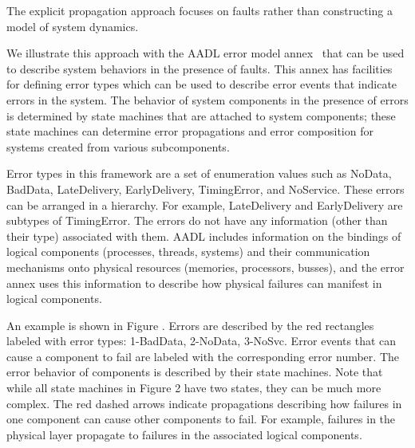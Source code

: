 The explicit propagation approach focuses on faults rather than constructing a model of system dynamics.  

We illustrate this approach with the AADL error model annex~\cite{SAEAS} that can be used to describe system behaviors in the presence of faults. This annex has facilities for defining error types which can be used to describe error events that indicate errors in the system. The behavior of system components in the presence of errors is determined by state machines that are attached to system components; these state machines can determine error propagations and error composition for systems created from various subcomponents.

Error types in this framework are a set of enumeration values such as NoData, BadData, LateDelivery, EarlyDelivery, TimingError, and NoService. These errors can be arranged in a hierarchy. For example, LateDelivery and EarlyDelivery are subtypes of TimingError. The errors do not have any information (other than their type) associated with them. AADL includes information on the bindings of logical components (processes, threads, systems) and their communication mechanisms onto physical resources (memories, processors, busses), and the error annex uses this information to describe how physical failures can manifest in logical components.

An example is shown in Figure . Errors are described by the red rectangles labeled with error types: 1-BadData, 2-NoData, 3-NoSvc. Error events that can cause a component to fail are labeled with the corresponding error number. The error behavior of components is described by their state machines. Note that while all state machines in Figure 2 have two states, they can be much more complex. The red dashed arrows indicate propagations describing how failures in one component can cause other components to fail. For example, failures in the physical layer propagate to failures in the associated logical components.

